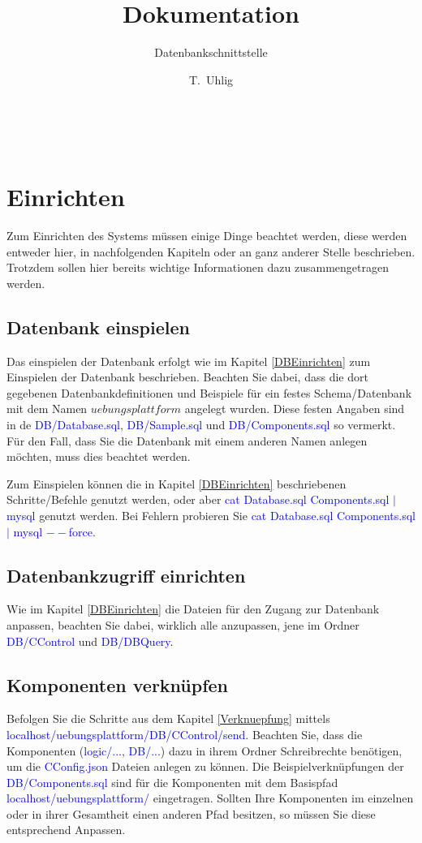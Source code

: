 \documentclass[10pt,a4paper,final,parskip]{scrartcl}
\title
{Dokumentation}
\author 
{T.~Uhlig}
\subtitle{Datenbankschnittstelle}
\date{}
\newcommand{\blau}[1]{\textcolor{blue}{#1}}
\begin{document}
\cleardoublepage
\maketitle

\cleardoublepage
~
\cleardoublepage

\tableofcontents
\cleardoublepage

\section{Einrichten}
Zum Einrichten des Systems müssen einige Dinge beachtet werden, diese werden entweder hier, in nachfolgenden Kapiteln oder an ganz anderer Stelle beschrieben. Trotzdem sollen hier bereits wichtige Informationen dazu zusammengetragen werden.

\subsection{ Datenbank einspielen}
Das einspielen der Datenbank erfolgt wie im Kapitel \ref{DBEinrichten} zum Einspielen der Datenbank beschrieben.
Beachten Sie dabei, dass die dort gegebenen Datenbankdefinitionen und Beispiele für ein festes Schema/Datenbank mit dem Namen $uebungsplattform$ angelegt wurden.
Diese festen Angaben sind in de \blau{DB/Database.sql}, \blau{DB/Sample.sql} und \blau{DB/Components.sql} so vermerkt. Für den Fall, dass Sie die Datenbank mit einem anderen Namen anlegen möchten, muss dies beachtet werden.

Zum Einspielen können die in Kapitel \ref{DBEinrichten} beschriebenen Schritte/Befehle genutzt werden, oder aber
\blau{cat Database.sql Components.sql $|$ mysql} genutzt werden.
Bei Fehlern probieren Sie \blau{cat Database.sql Components.sql $|$ mysql $--$force}.

\subsection{ Datenbankzugriff einrichten}
Wie im Kapitel \ref{DBEinrichten} die Dateien für den Zugang zur Datenbank anpassen, beachten Sie dabei, wirklich alle anzupassen, jene im Ordner \blau{DB/CControl} und \blau{DB/DBQuery}.

\subsection{ Komponenten verknüpfen}
Befolgen Sie die Schritte aus dem Kapitel \ref{Verknuepfung} mittels \blau{localhost/uebungsplattform/DB/CControl/send}. Beachten Sie, dass die Komponenten (\blau{logic/...}, \blau{DB/...}) dazu in ihrem Ordner Schreibrechte benötigen, um die \blau{CConfig.json} Dateien anlegen zu können.
Die Beispielverknüpfungen der \blau{DB/Components.sql} sind für die Komponenten mit dem Basispfad \blau{localhost/uebungsplattform/} eingetragen. Sollten Ihre Komponenten im einzelnen oder in ihrer Gesamtheit einen anderen Pfad besitzen, so müssen Sie diese entsprechend Anpassen.
\end{document}
